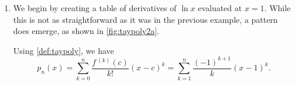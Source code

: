 {\begin{enumerate}
\item	We begin by creating a table of derivatives of $\ln x$ evaluated at $x=1$. While this is not as straightforward as it was in the previous example, a pattern does emerge, as shown in \autoref{fig:taypoly2a}.

Using \autoref{def:taypoly}, we have
\[
	p_n(x)
	= \sum_{k=0}^n\frac{f\,^{(k)}(c)}{k!}(x-c)^k
	= \sum_{k=1}^n\frac{(-1)^{k+1}}k(x-1)^k.
\]


\end{enumerate}}
